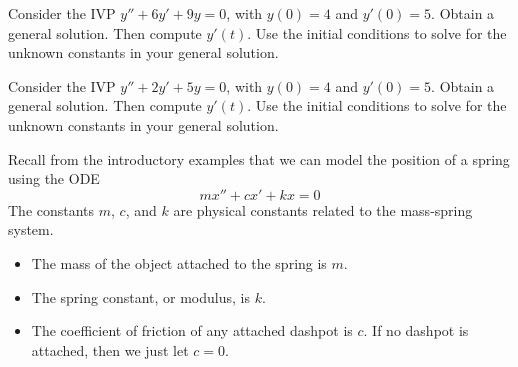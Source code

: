 \begin{problem}
 Consider the IVP $y''+6y'+9y=0$, with $y(0)=4$ and $y'(0)=5$.  Obtain a general solution. Then compute $y'(t)$. Use the initial conditions to solve for the unknown constants in your general solution. 
\end{problem}

\begin{problem}
 Consider the IVP $y''+2y'+5y=0$, with $y(0)=4$ and $y'(0)=5$.  Obtain a general solution. Then compute $y'(t)$. Use the initial conditions to solve for the unknown constants in your general solution. 
\end{problem}



 









 Recall from the introductory examples that we can model the position of a spring using the ODE $$mx''+cx'+kx=0$$
 The constants $m$, $c$, and $k$ are physical constants related to the mass-spring system.
\begin{itemize}
 \item The mass of the object attached to the spring is $m$.
 \item The spring constant, or modulus, is $k$.
 \item The coefficient of friction of any attached dashpot is $c$. If no dashpot is attached, then we just let $c=0$.
\end{itemize}

% 

